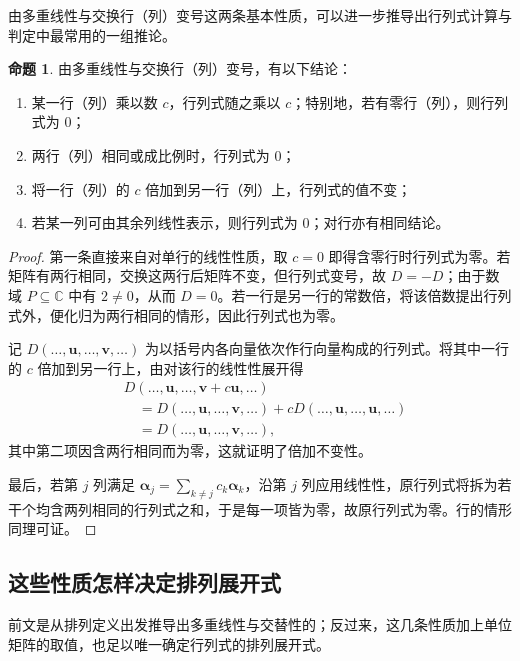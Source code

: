 \documentclass[UTF8, fontset=fandol, a4paper, 12pt]{ctexart}
\theoremstyle{definition}
\newtheorem{proposition}[theorem]{命题}
\begin{document}
由多重线性与交换行（列）变号这两条基本性质，可以进一步推导出行列式计算与判定中最常用的一组推论。

\begin{proposition}
由多重线性与交换行（列）变号，有以下结论：
\begin{enumerate}
 \item 某一行（列）乘以数 $c$，行列式随之乘以 $c$；特别地，若有零行（列），则行列式为 $0$；
 \item 两行（列）相同或成比例时，行列式为 $0$；
 \item 将一行（列）的 $c$ 倍加到另一行（列）上，行列式的值不变；
 \item 若某一列可由其余列线性表示，则行列式为 $0$；对行亦有相同结论。
\end{enumerate}
\end{proposition}
\begin{proof}
第一条直接来自对单行的线性性质，取 $c=0$ 即得含零行时行列式为零。若矩阵有两行相同，交换这两行后矩阵不变，但行列式变号，故 $D=-D$；由于数域 $P\subseteq\mathbb C$ 中有 $2\ne0$，从而 $D=0$。若一行是另一行的常数倍，将该倍数提出行列式外，便化归为两行相同的情形，因此行列式也为零。

记 $D(\ldots,\boldsymbol u,\ldots,\boldsymbol v,\ldots)$ 为以括号内各向量依次作行向量构成的行列式。将其中一行的 $c$ 倍加到另一行上，由对该行的线性性展开得
\begin{align*}
 &D(\ldots,\boldsymbol u,\ldots,\boldsymbol v+c\boldsymbol u,\ldots)\\
 &\quad=D(\ldots,\boldsymbol u,\ldots,\boldsymbol v,\ldots)
       +cD(\ldots,\boldsymbol u,\ldots,\boldsymbol u,\ldots)\\
 &\quad=D(\ldots,\boldsymbol u,\ldots,\boldsymbol v,\ldots),
\end{align*}
其中第二项因含两行相同而为零，这就证明了倍加不变性。

最后，若第 $j$ 列满足 $\boldsymbol\alpha_j=\sum_{k\ne j}c_k\boldsymbol\alpha_k$，沿第 $j$ 列应用线性性，原行列式将拆为若干个均含两列相同的行列式之和，于是每一项皆为零，故原行列式为零。行的情形同理可证。
\end{proof}

\subsection{这些性质怎样决定排列展开式}

前文是从排列定义出发推导出多重线性与交替性的；反过来，这几条性质加上单位矩阵的取值，也足以唯一确定行列式的排列展开式。
\end{document}
